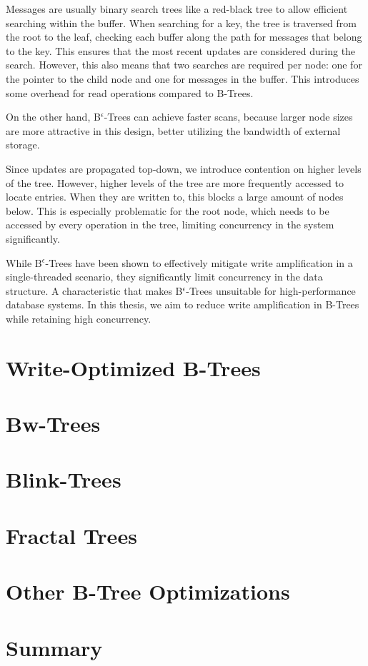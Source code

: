 Messages are usually binary search trees like a red-black tree to allow efficient searching within the buffer.
When searching for a key, the tree is traversed from the root to the leaf, checking each buffer along the path for messages that belong to the key.
This ensures that the most recent updates are considered during the search.
However, this also means that two searches are required per node: one for the pointer to the child node and one for messages in the buffer.
This introduces some overhead for read operations compared to B-Trees.

On the other hand, B$^\epsilon$-Trees can achieve faster scans, because larger node sizes are more attractive in this design, better utilizing the bandwidth of external storage.

Since updates are propagated top-down, we introduce contention on higher levels of the tree.
However, higher levels of the tree are more frequently accessed to locate entries.
When they are written to, this blocks a large amount of nodes below.
This is especially problematic for the root node, which needs to be accessed by every operation in the tree, limiting concurrency in the system significantly.

While B$^\epsilon$-Trees have been shown to effectively mitigate write amplification in a single-threaded scenario, they significantly limit concurrency in the data structure.
A characteristic that makes B$^\epsilon$-Trees unsuitable for high-performance database systems.
In this thesis, we aim to reduce write amplification in B-Trees while retaining high concurrency.

\section{Write-Optimized B-Trees}

\section{Bw-Trees}

\section{Blink-Trees}


\section{Fractal Trees}

\section{Other B-Tree Optimizations}

\section{Summary}